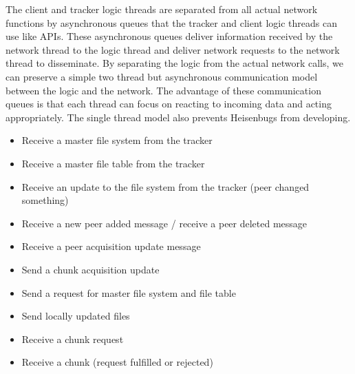 	
The client and tracker logic threads are separated from all actual network functions by asynchronous queues that the tracker and client logic threads can use like APIs. These asynchronous queues deliver information received by the network thread to the logic thread and deliver network requests to the network thread to disseminate. By separating the logic from the actual network calls, we can preserve a simple two thread but asynchronous communication model between the logic and the network.
The advantage of these communication queues is that each thread can focus on reacting to incoming data and acting appropriately. The single thread model also prevents Heisenbugs from developing. 



	\begin{itemize}
		\item Receive a master file system from the tracker
		\item Receive a master file table from the tracker
		\item Receive an update to the file system from the tracker (peer changed something)
		\item Receive a new peer added message / receive a peer deleted message
		\item Receive a peer acquisition update message
	\end{itemize}
 

	\begin{itemize}
		\item Send a chunk acquisition update
		\item Send a request for master file system and file table
		\item Send locally updated files
	\end{itemize}


\begin{itemize}
	\item Receive a chunk request
	\item Receive a chunk (request fulfilled or rejected)
\end{itemize}


